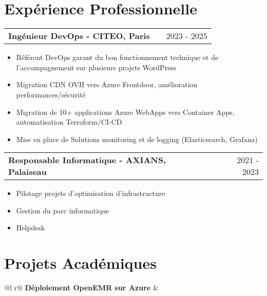 \documentclass[a4paper,11pt]{article}
\makeatletter
\newenvironment{joblong}[2]
    {
    \begin{tabularx}{\linewidth}{@{}l X r@{}}
    \textbf{#1} & \hfill &  #2 \\[2pt]
    \end{tabularx}
    \begin{minipage}[t]{\linewidth}
    \begin{itemize}[nosep,after=\strut, leftmargin=1em, itemsep=1pt,label=--]
    }
    {
    \end{itemize}
    \end{minipage}    
    }
\makeatother
\begin{document}
\vspace{6pt}


\section{Expérience Professionnelle}

\begin{joblong}{Ingénieur DevOps - CITEO, Paris}{2023 - 2025}
\item Référent DevOps garant du bon fonctionnement technique et de l’accompagnement sur plusieurs projets WordPress
\item Migration CDN OVH vers Azure Frontdoor, amélioration performances/sécurité
\item Migration de 10+ applications Azure WebApps vers Container Apps, automatisation Terraform/CI-CD
\item Mise en place de Solutions monitoring et de logging (Elasticsearch, Grafana)
\end{joblong}

\vspace{3pt}

\begin{joblong}{Responsable Informatique - AXIANS, Palaiseau}{2021 - 2023}
\item Pilotage projets d'optimisation d'infrastructure
\item Gestion du parc informatique
\item Helpdesk
\end{joblong}

\vspace{6pt}

  
\section{Projets Académiques}

\begin{tabularx}{\linewidth}{ @{}l r@{} }
\textbf{Déploiement OpenEMR sur Azure} & \hfill \\[1pt]
 \\
\end{tabularx}
\end{document}
